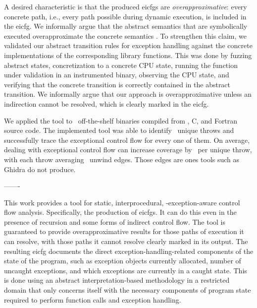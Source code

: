 A desired characteristic is that the produced \acp{eicfg} are \emph{overapproximative}: every concrete path, i.e., every path possible during dynamic execution, is included in the \ac{eicfg}.
We informally argue that the abstract semantics that are symbolically executed overapproximate the concrete semantics \autocite{cousot1996abstract}.
To strengthen this claim, we validated our abstract transition rules for exception handling against the concrete implementations of the corresponding library functions.
This was done by fuzzing abstract states, concretization to a concrete CPU state, running the function under validation in an instrumented binary, observing the CPU state, and verifying that the concrete transition is correctly contained in the abstract transition.
We informally argue that our approach is overapproximative unless an indirection cannot be resolved, which is clearly marked in the \ac{eicfg}.

We applied the tool to \totalbins\ off-the-shelf binaries compiled from \Cpp, C, and Fortran source code.
The implemented tool was able to identify \uniquethrows\ unique throws and successfully trace the exceptional control flow for every one of them.
On average, dealing with exceptional control flow can increase coverage by \avgdiffinst\ per unique throw, with each throw averaging \avgunwinds\ unwind edges.
Those edges are ones tools such as Ghidra do not produce.

-------

  This work provides a tool for static, interprocedural,
\Cpp-exception-aware control flow analysis.
Specifically, the production of \acp{eicfg}.
It can do this even in the presence of recursion and some forms of indirect control flow.
The tool is guaranteed to provide overapproximative results for those paths of execution it can resolve, with those paths it cannot resolve clearly marked in its output.
The resulting \ac{eicfg} documents the direct exception-handling-related components of the state of the program, such as exception objects currently allocated, number of uncaught exceptions, and which exceptions are currently in a caught state.
This is done using an abstract interpretation-based methodology in a restricted domain that only concerns itself with the necessary components of program state required to perform function calls and exception handling.

